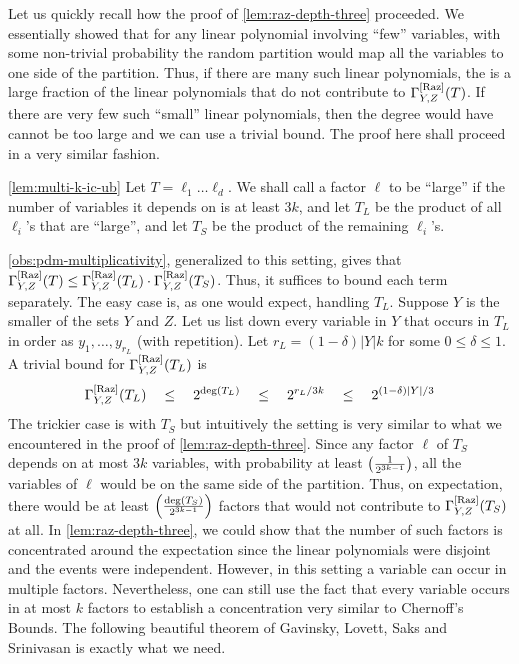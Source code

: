 Let us quickly recall how the proof of \autoref{lem:raz-depth-three} proceeded. 
We essentially showed that for any linear polynomial involving ``few'' variables, with some non-trivial probability the random partition would map all the variables to one side of the partition. 
Thus, if there are many such linear polynomials, the is a large fraction of the linear polynomials that do not contribute to $\Gamma^{\mathrm{[Raz]}}_{Y,Z}(T)$. 
If there are very few such ``small'' linear polynomials, then the degree would have cannot be too large and we can use a trivial bound. 
The proof here shall proceed in a very similar fashion. 


\begin{proofof}{\autoref{lem:multi-k-ic-ub}}
Let $T = \ell_1 \dots \ell_d$. 
We shall call a factor $\ell$ to be ``large'' if the number of variables it depends on is at least $3k$, and let $T_L$ be the product of all $\ell_i$'s that are ``large'', and let $T_S$ be the product of the remaining $\ell_i$'s. 


\autoref{obs:pdm-multiplicativity}, generalized to this setting, gives that $\Gamma^{\mathrm{[Raz]}}_{Y,Z}(T) \leq \Gamma^{\mathrm{[Raz]}}_{Y,Z}(T_L) \cdot \Gamma^{\mathrm{[Raz]}}_{Y,Z}(T_S)$. 
Thus, it suffices to bound each term separately. 
The easy case is, as one would expect, handling $T_L$. 
Suppose $Y$ is the smaller of the sets $Y$ and $Z$. 
Let us list down every variable in $Y$ that occurs in $T_L$ in order as $y_1,\dots, y_{r_L}$ (with repetition). 
Let $r_L = (1-\delta) |Y|k$ for some $0\leq \delta \leq 1$. 
A trivial bound for $\Gamma^{\mathrm{[Raz]}}_{Y,Z}(T_L)$ is 
\begin{equation}\label{eqn:TL-bound}
\Gamma^{\mathrm{[Raz]}}_{Y,Z}(T_L)\quad \leq \quad 2^{\deg(T_L)} \quad \leq \quad 2^{r_L/3k} \quad \leq \quad 2^{(1-\delta)|Y|/3}
\end{equation}
The trickier case is with $T_S$ but intuitively the setting is very similar to what we encountered in the proof of \autoref{lem:raz-depth-three}. 
Since any factor $\ell$ of $T_S$ depends on at most $3k$ variables, with probability at least $\left(\frac{1}{2^{3k-1}}\right)$, all the variables of $\ell$ would be on the same side of the partition. 
Thus, on expectation, there would be at least $\left(\frac{\deg(T_S)}{2^{3k-1}}\right)$ factors that would not contribute to $\Gamma^{\mathrm{[Raz]}}_{Y,Z}(T_S)$ at all. 
In \autoref{lem:raz-depth-three}, we could show that the number of such factors is concentrated around the expectation since the linear polynomials were disjoint and the events were independent. 
However, in this setting a variable can occur in multiple factors. 
Nevertheless, one can still use the fact that every variable occurs in at most $k$ factors to establish a concentration very similar to Chernoff's Bounds. 
The following beautiful theorem of Gavinsky, Lovett, Saks and Srinivasan \cite{GLSS12} is exactly what we need. 


\end{proofof}

